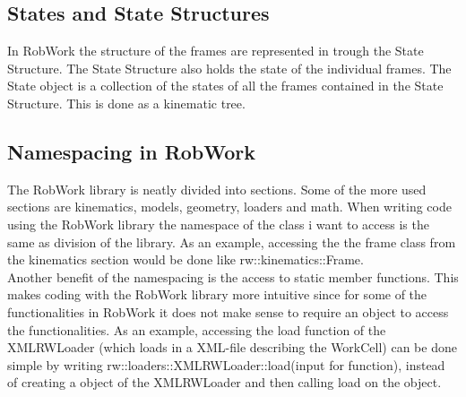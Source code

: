 \subsection{States and State Structures}
In RobWork the structure of the frames are represented in trough the State Structure. The State Structure also holds the state of the individual frames. The State object is a collection of the states of all the frames contained in the State Structure. This is done as a kinematic tree.


\subsection{Namespacing in RobWork}
The RobWork library is neatly divided into sections. Some of the more used sections are kinematics, models, geometry, loaders and math. When writing code using the RobWork library the namespace of the class i want to access is the same as division of the library. As an example, accessing the the frame class from the kinematics section would be done like rw::kinematics::Frame.\\

Another benefit of the namespacing is the access to static member functions. This makes coding with the RobWork library more intuitive since for some of the functionalities in RobWork it does not make sense to require an object to access the functionalities. As an example, accessing the load function of the XMLRWLoader (which loads in a XML-file describing the WorkCell) can be done simple by writing rw::loaders::XMLRWLoader::load(input for function), instead of creating a object of the XMLRWLoader and then calling load on the object.


